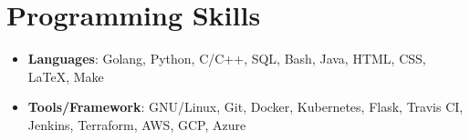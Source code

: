 \documentclass[letterpaper,10pt]{article}
\begin{document}
\section{Programming Skills}
 \vspace{4pt}
    \begin{itemize}[leftmargin=*]
    \setlength{\itemsep}{0pt}
    \item{
      \textbf{Languages}{: Golang, Python, C/C++, SQL, Bash, Java, HTML, CSS, \LaTeX, Make}}
    \item{
	\textbf{Tools/Framework}{: GNU/Linux, Git, Docker, Kubernetes, Flask, Travis CI, Jenkins, Terraform, AWS, GCP, Azure}}
  
    \end{itemize}



\end{document}
